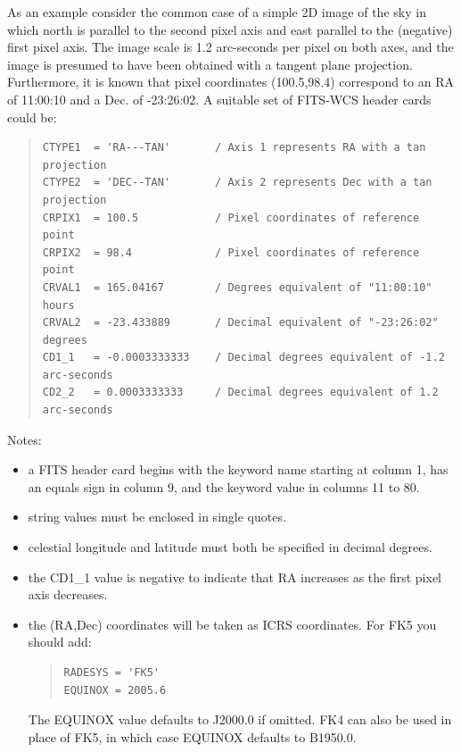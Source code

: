 \documentclass[twoside,11pt]{article}
\begin{document}
As an example consider the common case of a simple 2D image of the sky in
which north is parallel to the second pixel axis and east parallel to the
(negative) first pixel axis. The image scale is 1.2 arc-seconds per pixel
on both axes, and the image is presumed to have been obtained with a
tangent plane projection. Furthermore, it is known that pixel coordinates
(100.5,98.4) correspond to an RA of 11:00:10 and a Dec. of  -23:26:02.
A suitable set of FITS-WCS header cards could be:

\begin{quote}
\small
\begin{verbatim}
CTYPE1  = 'RA---TAN'       / Axis 1 represents RA with a tan projection
CTYPE2  = 'DEC--TAN'       / Axis 2 represents Dec with a tan projection
CRPIX1  = 100.5            / Pixel coordinates of reference point
CRPIX2  = 98.4             / Pixel coordinates of reference point
CRVAL1  = 165.04167        / Degrees equivalent of "11:00:10" hours
CRVAL2  = -23.433889       / Decimal equivalent of "-23:26:02" degrees
CD1_1   = -0.0003333333    / Decimal degrees equivalent of -1.2 arc-seconds
CD2_2   = 0.0003333333     / Decimal degrees equivalent of 1.2 arc-seconds
\end{verbatim}
\normalsize
\end{quote}

Notes:
\begin{itemize}
\item a FITS header card begins with the keyword name starting at column 1,
has an equals sign in column 9, and the keyword value in columns 11 to 80.
\item string values must be enclosed in single quotes.
\item celestial longitude and latitude must both be specified in decimal degrees.
\item the CD1\_1 value is negative to indicate that RA increases as the
first pixel axis decreases.
\item the (RA,Dec) coordinates will be taken as ICRS coordinates. For FK5
you should add:

\begin{quote}
\small
\begin{verbatim}
RADESYS = 'FK5'
EQUINOX = 2005.6
\end{verbatim}
\normalsize
\end{quote}

The EQUINOX value defaults to J2000.0 if omitted. FK4 can also be used in
place of FK5, in which case EQUINOX defaults to B1950.0.

\end{itemize}
\end{document}
